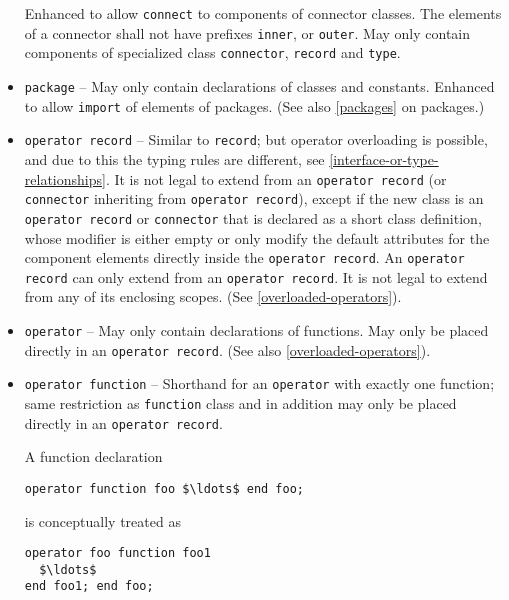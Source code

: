 \begin{itemize}
Enhanced to allow \lstinline!connect! to components of connector classes.
The elements of a connector shall not have prefixes \lstinline!inner!, or \lstinline!outer!.
May only contain components of specialized class \lstinline!connector!, \lstinline!record! and \lstinline!type!.

\item \lstinline!package! --
May only contain declarations of classes and constants.
Enhanced to allow \lstinline!import! of elements of packages.
(See also \cref{packages} on packages.)

\item \lstinline!operator record! --
Similar to \lstinline!record!; but operator overloading is possible, and due to this the typing rules are different, see \cref{interface-or-type-relationships}.
It is not legal to extend from an \lstinline!operator record! (or \lstinline!connector! inheriting from \lstinline!operator record!), except if the new class is an \lstinline!operator record! or \lstinline!connector! that is declared as a short class definition, whose modifier is either empty or only modify the default attributes for the component elements directly inside the \lstinline!operator record!.
An \lstinline!operator record! can only extend from an \lstinline!operator record!.
It is not legal to extend from any of its enclosing scopes.
(See \cref{overloaded-operators}).

\item \lstinline!operator! --
May only contain declarations of functions.
May only be placed directly in an \lstinline!operator record!.
(See also \cref{overloaded-operators}).

\item \lstinline!operator function! --
Shorthand for an \lstinline!operator! with exactly one function; same restriction as \lstinline!function! class and in addition may only be placed directly in an \lstinline!operator record!.
\begin{nonnormative}
A function declaration
\begin{lstlisting}[language=modelica]
operator function foo $\ldots$ end foo;
\end{lstlisting}
is conceptually treated as
\begin{lstlisting}[language=modelica]
operator foo function foo1
  $\ldots$
end foo1; end foo;
\end{lstlisting}
\end{nonnormative}

\end{itemize}

